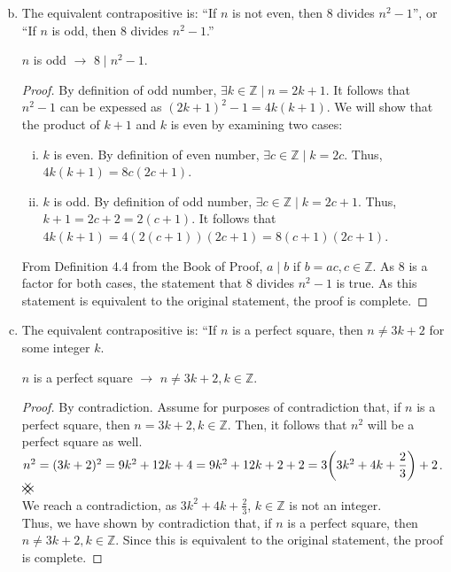 \documentclass[11pt]{scrartcl}
\theoremstyle{dotlessP}
\theoremstyle{dotlessN}
\DeclarePairedDelimiter\paren{(}{)} %
\newcommand{\ints}{\mathbb{Z}}
\newcommand{\contradiction}{{\hbox{%
    \setbox0=\hbox{$\mkern-3mu\times\mkern-3mu$}%
    \setbox1=\hbox to0pt{\hss$\times$\hss}%
    \copy0\raisebox{0.5\wd0}{\copy1}\raisebox{-0.5\wd0}{\box1}\box0
}}}
\begin{document}
	\begin{enumerate}[(a)]
		\setcounter{enumi}{1}	
		\item The equivalent contrapositive is: ``If $n$ is not even, then $8$ divides $n^2 -1$'', or  ``If $n$ is odd, then $8$ divides $n^2-1$.''
		\begin{claim*}
			[b]
			$n$ is odd $\to$ $8 \mid n^2 -1$.
		\end{claim*}
		\begin{proof}
			By definition of odd number, $\exists k \in \ints \mid n = 2k+1$. It follows that $n^2-1$ can be expessed as $(2k+1)^2 - 1 = 4k(k+1)$. We will show that the product of $k+1$ and $k$ is even by examining two cases:
			\begin{enumerate}[i)]
				\item $k$ is even. By definition of even number, $\exists c \in \ints \mid k = 2c$. Thus, $4k(k+1) = 8c(2c + 1)$.
				\item $k$ is odd. By definition of odd number, $\exists c \in \ints \mid k = 2c + 1$. Thus,  $k+1 = 2c+2 = 2(c+1)$. It follows that $4k(k+1) = 4(2(c+1))(2c+1) = 8(c+1)(2c+1)$.
			\end{enumerate}
			From Definition 4.4 from the Book of Proof, $a \mid b$ if $b = ac, c \in \ints$. As 8 is a factor for both cases, the statement that 8 divides $n^2 - 1$ is true. As this statement is equivalent to the original statement, the proof is complete.
		\end{proof}
		\item The equivalent contrapositive is: ``If $n$ is a perfect square, then $n \neq 3k+2$ for some integer $k$.
			\begin{claim*}
				[c]
				$n$ is a perfect square $\to$ $n \neq 3k+2, k \in \ints$.
			\end{claim*}
			\begin{proof}
				By contradiction. Assume for purposes of contradiction that, if $n$ is a perfect square, then $n = 3k+2, k \in \ints$. Then, it follows that  $n^2$ will be a perfect square as well. $n^2 = (3k+2)^2 = 9k^2 + 12k + 4 = 9k^2 + 12k + 2 + 2 = 3\paren*{3k^2 + 4k + \displaystyle \frac{2}{3}} + 2$. $\contradiction$
				\\
				
				We reach a contradiction, as  $3k^2 + 4k + \displaystyle \frac{2}{3} $, $k \in \ints$ is not an integer. \\

				Thus, we have shown by contradiction that, if $n$ is a perfect square, then $n \neq 3k+2, k \in \ints$. Since this is equivalent to the original statement, the proof is complete.
			\end{proof}
	\end{enumerate}
\end{document}
